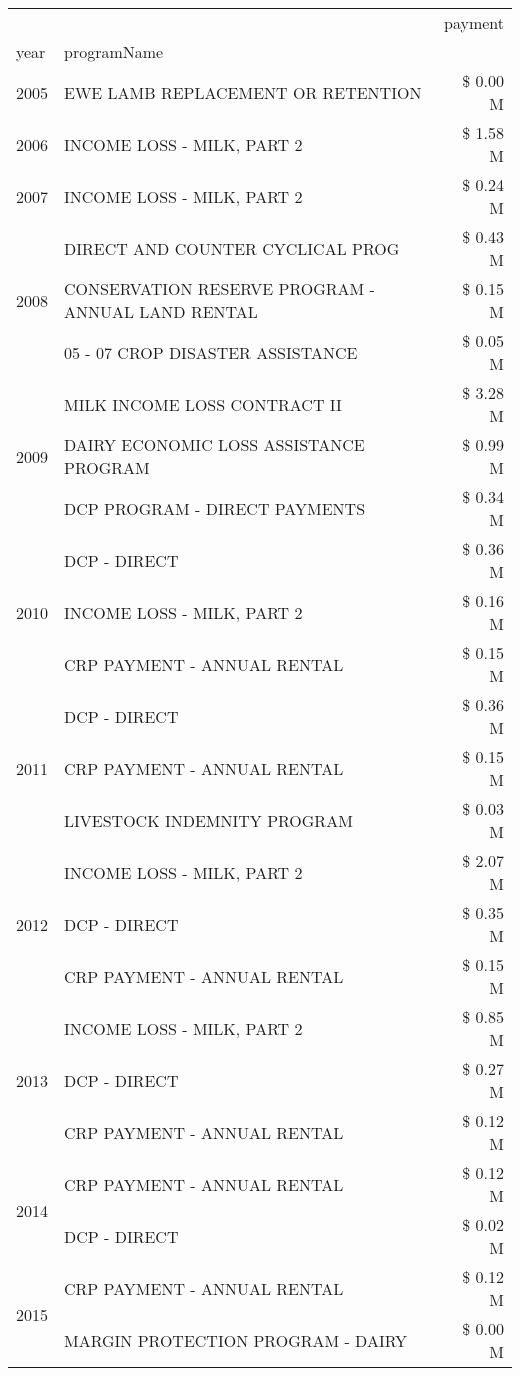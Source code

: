 \begin{tabular}{llr}
\toprule
 &  & payment \\
year & programName &  \\
\midrule
2005 & EWE LAMB REPLACEMENT OR RETENTION & \$ 0.00 M \\
\cline{1-3}
2006 & INCOME LOSS - MILK, PART 2 & \$ 1.58 M \\
\cline{1-3}
2007 & INCOME LOSS - MILK, PART 2 & \$ 0.24 M \\
\cline{1-3}
\multirow[t]{3}{*}{2008} & DIRECT AND COUNTER CYCLICAL PROG & \$ 0.43 M \\
 & CONSERVATION RESERVE PROGRAM - ANNUAL LAND RENTAL & \$ 0.15 M \\
 & 05 - 07 CROP DISASTER ASSISTANCE & \$ 0.05 M \\
\cline{1-3}
\multirow[t]{3}{*}{2009} & MILK INCOME LOSS CONTRACT II & \$ 3.28 M \\
 & DAIRY ECONOMIC LOSS ASSISTANCE PROGRAM & \$ 0.99 M \\
 & DCP PROGRAM - DIRECT PAYMENTS & \$ 0.34 M \\
\cline{1-3}
\multirow[t]{3}{*}{2010} & DCP - DIRECT & \$ 0.36 M \\
 & INCOME LOSS - MILK, PART 2 & \$ 0.16 M \\
 & CRP PAYMENT - ANNUAL RENTAL & \$ 0.15 M \\
\cline{1-3}
\multirow[t]{3}{*}{2011} & DCP - DIRECT & \$ 0.36 M \\
 & CRP PAYMENT - ANNUAL RENTAL & \$ 0.15 M \\
 & LIVESTOCK INDEMNITY PROGRAM & \$ 0.03 M \\
\cline{1-3}
\multirow[t]{3}{*}{2012} & INCOME LOSS - MILK, PART 2 & \$ 2.07 M \\
 & DCP - DIRECT & \$ 0.35 M \\
 & CRP PAYMENT - ANNUAL RENTAL & \$ 0.15 M \\
\cline{1-3}
\multirow[t]{3}{*}{2013} & INCOME LOSS - MILK, PART 2 & \$ 0.85 M \\
 & DCP - DIRECT & \$ 0.27 M \\
 & CRP PAYMENT - ANNUAL RENTAL & \$ 0.12 M \\
\cline{1-3}
\multirow[t]{2}{*}{2014} & CRP PAYMENT - ANNUAL RENTAL & \$ 0.12 M \\
 & DCP - DIRECT & \$ 0.02 M \\
\cline{1-3}
\multirow[t]{3}{*}{2015} & CRP PAYMENT - ANNUAL RENTAL & \$ 0.12 M \\
 & MARGIN PROTECTION PROGRAM - DAIRY & \$ 0.00 M \\

\end{tabular}
